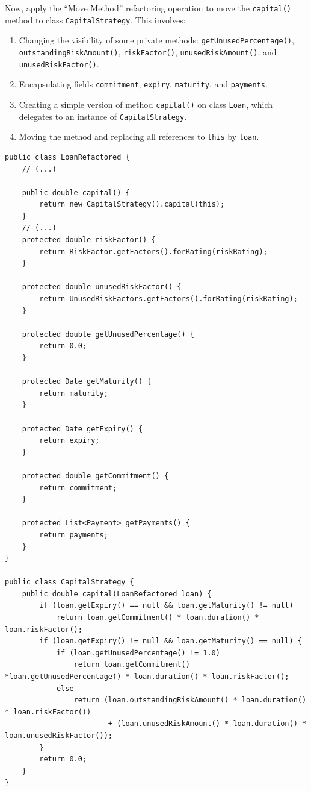 \documentclass[a4paper,11pt]{memoir}
\newcommand{\code}[1]{\lstinline{#1}}
\begin{document}
\begin{exercise}
Now, apply the ``Move Method'' refactoring operation to move the \code{capital()} method to class \code{CapitalStrategy}.  This involves:

\begin{enumerate}
	\item Changing the visibility of some private methods: \code{getUnusedPercentage()}, \code{outstandingRiskAmount()}, \code{riskFactor()}, \code{unusedRiskAmount()}, and \code{unusedRiskFactor()}.
	\item Encapsulating fields \code{commitment}, \code{expiry}, \code{maturity}, and \code{payments}.
	\item Creating a simple version of method \code{capital()} on class \code{Loan}, which delegates to an instance of \code{CapitalStrategy}.
	\item Moving the method and replacing all references to \code{this} by \code{loan}.
\end{enumerate}

\end{exercise}
\begin{solution}
\begin{lstlisting}[caption=cap,label=lst:lab,float=htbp]
public class LoanRefactored {
    // (...)

    public double capital() {
        return new CapitalStrategy().capital(this);
    }
    // (...)
    protected double riskFactor() {
        return RiskFactor.getFactors().forRating(riskRating);
    }

    protected double unusedRiskFactor() {
        return UnusedRiskFactors.getFactors().forRating(riskRating);
    }

    protected double getUnusedPercentage() {
        return 0.0;
    }

    protected Date getMaturity() {
        return maturity;
    }

    protected Date getExpiry() {
        return expiry;
    }

    protected double getCommitment() {
        return commitment;
    }

    protected List<Payment> getPayments() {
        return payments;
    }
}

public class CapitalStrategy {
    public double capital(LoanRefactored loan) {
        if (loan.getExpiry() == null && loan.getMaturity() != null)
            return loan.getCommitment() * loan.duration() * loan.riskFactor();
        if (loan.getExpiry() != null && loan.getMaturity() == null) {
            if (loan.getUnusedPercentage() != 1.0)
                return loan.getCommitment() *loan.getUnusedPercentage() * loan.duration() * loan.riskFactor();
            else
                return (loan.outstandingRiskAmount() * loan.duration() * loan.riskFactor())
                        + (loan.unusedRiskAmount() * loan.duration() * loan.unusedRiskFactor());
        }
        return 0.0;
    }
}
\end{lstlisting}
\end{solution}
\end{document}
